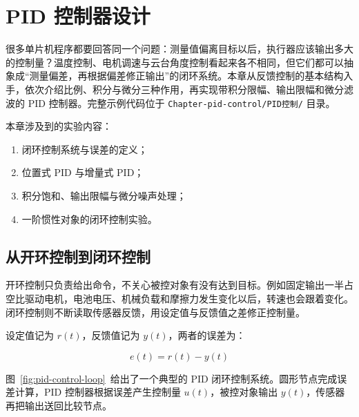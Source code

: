 \chapter{PID 控制器设计} \label{ch:pid-control}

很多单片机程序都要回答同一个问题：测量值偏离目标以后，执行器应该输出多大的控制量？温度控制、电机调速与云台角度控制看起来各不相同，但它们都可以抽象成“测量偏差，再根据偏差修正输出”的闭环系统。本章从反馈控制的基本结构入手，依次介绍比例、积分与微分三种作用，再实现带积分限幅、输出限幅和微分滤波的 PID 控制器。完整示例代码位于 \texttt{Chapter-pid-control/PID控制/} 目录。

\medskip 本章涉及到的实验内容：
\begin{enumerate}
\item 闭环控制系统与误差的定义；
\item 位置式 PID 与增量式 PID；
\item 积分饱和、输出限幅与微分噪声处理；
\item 一阶惯性对象的闭环控制实验。
\end{enumerate}

\section{从开环控制到闭环控制}

开环控制只负责给出命令，不关心被控对象有没有达到目标。例如固定输出一半占空比驱动电机，电池电压、机械负载和摩擦力发生变化以后，转速也会跟着变化。闭环控制则不断读取传感器反馈，用设定值与反馈值之差修正控制量。

设定值记为 $r(t)$，反馈值记为 $y(t)$，两者的误差为：

\begin{equation}
e(t)=r(t)-y(t)
\label{eq:pid-error}
\end{equation}

图~\ref{fig:pid-control-loop}~给出了一个典型的 PID 闭环控制系统。圆形节点完成误差计算，PID 控制器根据误差产生控制量 $u(t)$，被控对象输出 $y(t)$，传感器再把输出送回比较节点。

